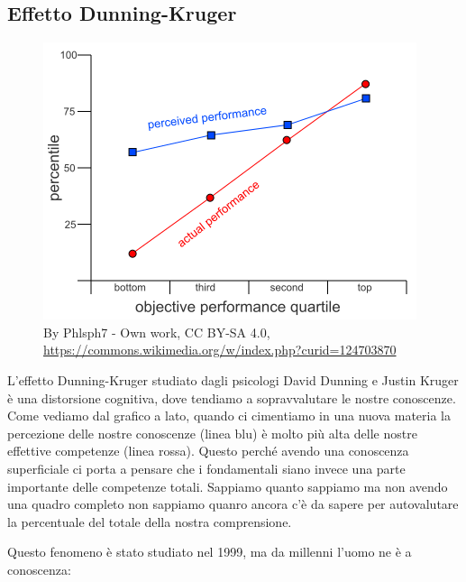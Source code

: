 \documentclass[12pt]{book} %
\begin{document}
\bigskip

\subsection[Effetto Dunning{}-Kruger]{Effetto Dunning-Kruger}

\begin{figure}
  \centering
  \includegraphics[width=0.95\linewidth]{images/Libro-img001.png}
  \begin{minipage}{\linewidth}
    \caption{By Phlsph7 - Own work, CC BY-SA 4.0, \protect\url{https://commons.wikimedia.org/w/index.php?curid=124703870}}
  \end{minipage}
\end{figure}

L'effetto Dunning-Kruger studiato dagli psicologi David Dunning e Justin
Kruger è una distorsione cognitiva, dove tendiamo a
sopravvalutare le nostre conoscenze. Come vediamo dal grafico a lato, quando ci cimentiamo in una nuova materia la
percezione delle nostre conoscenze (linea blu) è molto più alta delle nostre effettive competenze (linea rossa). Questo
perché avendo una conoscenza superficiale ci porta a pensare che i fondamentali siano invece una parte importante delle
competenze totali. Sappiamo quanto sappiamo ma non avendo una quadro completo non sappiamo quanro ancora
c'è da sapere per autovalutare la percentuale del totale della nostra comprensione.

Questo fenomeno è stato studiato nel 1999, ma da millenni l'uomo ne è a conoscenza:
\end{document}

